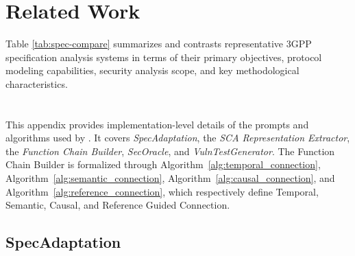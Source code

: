 \appendix

\clearpage





\vspace{-5pt}

\section{Related Work}
\label{append:Related_Work}
Table \ref{tab:spec-compare} summarizes and contrasts representative 3GPP specification analysis systems in terms of their primary objectives, protocol modeling capabilities, security analysis scope, and key methodological characteristics.



\section{\textit{\lm}}
\label{append:prompt_algorithm}
This appendix provides implementation-level details of the prompts and algorithms used by \lm. It covers \textit{SpecAdaptation}, the \textit{SCA Representation Extractor}, the \textit{Function Chain Builder}, \textit{SecOracle}, and \textit{VulnTestGenerator}. The Function Chain Builder is formalized through Algorithm~\ref{alg:temporal_connection}, Algorithm~\ref{alg:semantic_connection}, Algorithm~\ref{alg:causal_connection}, and Algorithm~\ref{alg:reference_connection}, which respectively define Temporal, Semantic, Causal, and Reference Guided Connection.

\subsection{SpecAdaptation}

\vspace{-5pt}

